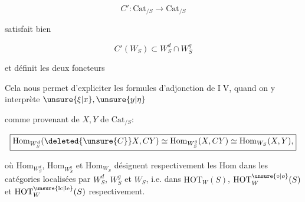 \[
C':\mathrm{Cat}_{/S}\longrightarrow\mathrm{Cat}_{/S}
\]

satisfait bien

\[
C'(W_S)\subset W_S^d\cap W_S^g
\]

et définit les deux foncteurs


Cela nous permet d'expliciter les formules d'adjonction de \textcircled{IV}, quand on y interprète $\unsure{\xi|x},\unsure{y|\eta}$

comme \inserted{\unsure{(,)}} provenant de $X,Y$ de $\mathrm{Cat}_{/S}$:

\[
\boxed{\mathrm{Hom}_{W_S^d}(\deleted{\unsure{C}}X,CY)\simeq\mathrm{Hom}_{W_S^g}(X,CY)\simeq\mathrm{Hom}_{W_S}(X,Y),}
\]


où $\mathrm{Hom}_{W_S^d}$, $\mathrm{Hom}_{W_S^g}$ et $\mathrm{Hom}_{W_S}$ désignent respectivement les  $\mathrm{Hom}$ dans les catégories localisées par $W_S^d$, $W_S^g$ et $W_S$, i.e. dans $\mathrm{HOT}_W(S)$, $\mathrm{HOT}_W^{\unsure{\circ|o}}(S)$ et $\mathrm{HOT}_W^{\unsure{\mathrm{lc}|\mathrm{le}}}(S)$ respectivement.

